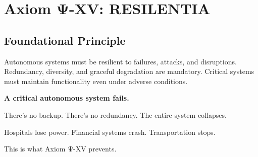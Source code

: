 

\chapter{Axiom Ψ-XV: RESILENTIA}
\label{ch:axiom-XV}

\section*{Foundational Principle}

\begin{principlebox}
Autonomous systems must be resilient to failures, attacks, and disruptions. Redundancy, diversity, and graceful degradation are mandatory. Critical systems must maintain functionality even under adverse conditions.
\end{principlebox}

\vspace{0.5cm}

\begin{tcolorbox}[colback=lightgray, colframe=legislativeblue, title=\textbf{📖 Why This Axiom Matters}]
\textbf{A critical autonomous system fails.}

There's no backup. There's no redundancy. The entire system collapses.

Hospitals lose power. Financial systems crash. Transportation stops.

This is what Axiom Ψ-XV prevents.
\end{tcolorbox}

\vspace{0.5cm}

